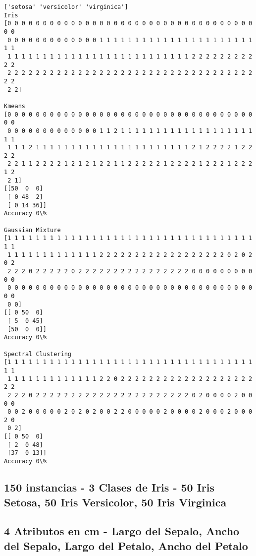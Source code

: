 \documentclass[11pt]{article}
\begin{document}
    \begin{Verbatim}[commandchars=\\\{\}]
['setosa' 'versicolor' 'virginica']
Iris
[0 0 0 0 0 0 0 0 0 0 0 0 0 0 0 0 0 0 0 0 0 0 0 0 0 0 0 0 0 0 0 0 0 0 0 0 0
 0 0 0 0 0 0 0 0 0 0 0 0 0 1 1 1 1 1 1 1 1 1 1 1 1 1 1 1 1 1 1 1 1 1 1 1 1
 1 1 1 1 1 1 1 1 1 1 1 1 1 1 1 1 1 1 1 1 1 1 1 1 1 1 2 2 2 2 2 2 2 2 2 2 2
 2 2 2 2 2 2 2 2 2 2 2 2 2 2 2 2 2 2 2 2 2 2 2 2 2 2 2 2 2 2 2 2 2 2 2 2 2
 2 2]

Kmeans
[0 0 0 0 0 0 0 0 0 0 0 0 0 0 0 0 0 0 0 0 0 0 0 0 0 0 0 0 0 0 0 0 0 0 0 0 0
 0 0 0 0 0 0 0 0 0 0 0 0 0 1 1 2 1 1 1 1 1 1 1 1 1 1 1 1 1 1 1 1 1 1 1 1 1
 1 1 1 2 1 1 1 1 1 1 1 1 1 1 1 1 1 1 1 1 1 1 1 1 1 1 2 1 2 2 2 2 1 2 2 2 2
 2 2 1 1 2 2 2 2 1 2 1 2 1 2 2 1 1 2 2 2 2 2 1 2 2 2 2 1 2 2 2 1 2 2 2 1 2
 2 1]
[[50  0  0]
 [ 0 48  2]
 [ 0 14 36]]
Accuracy 0\%

Gaussian Mixture
[1 1 1 1 1 1 1 1 1 1 1 1 1 1 1 1 1 1 1 1 1 1 1 1 1 1 1 1 1 1 1 1 1 1 1 1 1
 1 1 1 1 1 1 1 1 1 1 1 1 1 2 2 2 2 2 2 2 2 2 2 2 2 2 2 2 2 2 2 0 2 0 2 0 2
 2 2 2 0 2 2 2 2 2 0 2 2 2 2 2 2 2 2 2 2 2 2 2 2 2 2 0 0 0 0 0 0 0 0 0 0 0
 0 0 0 0 0 0 0 0 0 0 0 0 0 0 0 0 0 0 0 0 0 0 0 0 0 0 0 0 0 0 0 0 0 0 0 0 0
 0 0]
[[ 0 50  0]
 [ 5  0 45]
 [50  0  0]]
Accuracy 0\%

Spectral Clustering
[1 1 1 1 1 1 1 1 1 1 1 1 1 1 1 1 1 1 1 1 1 1 1 1 1 1 1 1 1 1 1 1 1 1 1 1 1
 1 1 1 1 1 1 1 1 1 1 1 1 1 2 2 0 2 2 2 2 2 2 2 2 2 2 2 2 2 2 2 2 2 2 2 2 2
 2 2 2 0 2 2 2 2 2 2 2 2 2 2 2 2 2 2 2 2 2 2 2 2 2 2 0 2 0 0 0 0 2 0 0 0 0
 0 0 2 0 0 0 0 0 2 0 2 0 2 0 0 2 2 0 0 0 0 0 2 0 0 0 0 2 0 0 0 2 0 0 0 2 0
 0 2]
[[ 0 50  0]
 [ 2  0 48]
 [37  0 13]]
Accuracy 0\%

    \end{Verbatim}

    \subsection{150 instancias - 3 Clases de Iris - 50 Iris Setosa, 50 Iris
Versicolor, 50 Iris
Virginica}\label{instancias---3-clases-de-iris---50-iris-setosa-50-iris-versicolor-50-iris-virginica}

\subsection{4 Atributos en cm - Largo del Sepalo, Ancho del Sepalo,
Largo del Petalo, Ancho del
Petalo}\label{atributos-en-cm---largo-del-sepalo-ancho-del-sepalo-largo-del-petalo-ancho-del-petalo}
\end{document}
